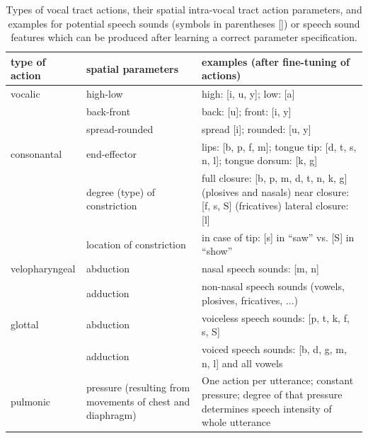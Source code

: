 \documentclass[conference]{IEEEtran}
\begin{document}
\begin{table}[!t]
\renewcommand{\arraystretch}{1.3}
\caption{Types of vocal tract actions, their spatial intra-vocal tract
  action parameters, and examples for potential speech sounds (symbols
  in parentheses []) or speech sound features which can be produced
  after learning a correct parameter specification.}
\label{tab:actions}
\centering
\begin{tabular}{l|p{2.5cm}|p{4cm}}
  type of action & spatial parameters & examples (after fine-tuning of
  actions)\\
  \hline
  vocalic & high-low & high: [i, u, y]; low: [a]\\
  ~ & back-front & back: [u]; front: [i, y]\\
  ~ & spread-rounded & spread [i]; rounded: [u, y]\\
  \hline
  consonantal & end-effector & lips: [b, p, f, m];
  tongue tip: [d, t, s, n, l]; tongue dorsum: [k, g]\\
  ~ & degree (type) of constriction &
  full closure: [b, p, m, d, t, n, k, g] (plosives and nasals) \newline
  near closure: [f, s, S] (fricatives) \newline
  lateral closure: [l]\\
  ~ & location of constriction & in case of tip: [s] in ``saw''
  vs. [S] in ``show''\\
  \hline
  velopharyngeal & abduction & nasal speech sounds: [m, n]\\
  ~ & adduction & non-nasal speech sounds (vowels, plosives, fricatives,
  ...)\\
  \hline
  glottal & abduction & voiceless speech sounds: [p, t, k, f, s, S]\\
  ~ & adduction & voiced speech sounds: [b, d, g, m, n, l] and all
  vowels\\
  pulmonic & pressure (resulting from movements of chest and diaphragm)
  & One action per utterance; constant pressure;
  degree of that pressure determines speech intensity of whole utterance
\end{tabular}
\end{table}
\end{document}
